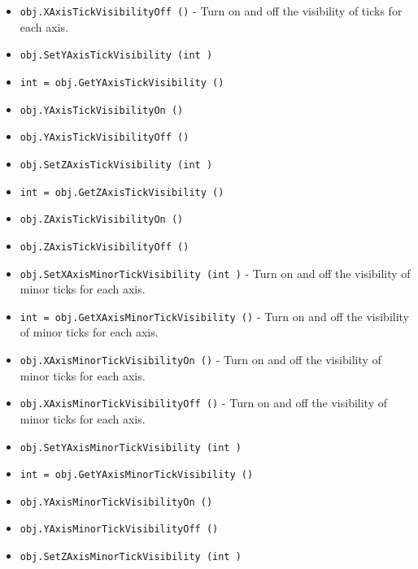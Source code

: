 \begin{itemize}
\item  \verb|obj.XAxisTickVisibilityOff ()| -  Turn on and off the visibility of ticks for each axis.

\item  \verb|obj.SetYAxisTickVisibility (int )|

\item  \verb|int = obj.GetYAxisTickVisibility ()|

\item  \verb|obj.YAxisTickVisibilityOn ()|

\item  \verb|obj.YAxisTickVisibilityOff ()|

\item  \verb|obj.SetZAxisTickVisibility (int )|

\item  \verb|int = obj.GetZAxisTickVisibility ()|

\item  \verb|obj.ZAxisTickVisibilityOn ()|

\item  \verb|obj.ZAxisTickVisibilityOff ()|

\item  \verb|obj.SetXAxisMinorTickVisibility (int )| -  Turn on and off the visibility of minor ticks for each axis.

\item  \verb|int = obj.GetXAxisMinorTickVisibility ()| -  Turn on and off the visibility of minor ticks for each axis.

\item  \verb|obj.XAxisMinorTickVisibilityOn ()| -  Turn on and off the visibility of minor ticks for each axis.

\item  \verb|obj.XAxisMinorTickVisibilityOff ()| -  Turn on and off the visibility of minor ticks for each axis.

\item  \verb|obj.SetYAxisMinorTickVisibility (int )|

\item  \verb|int = obj.GetYAxisMinorTickVisibility ()|

\item  \verb|obj.YAxisMinorTickVisibilityOn ()|

\item  \verb|obj.YAxisMinorTickVisibilityOff ()|

\item  \verb|obj.SetZAxisMinorTickVisibility (int )|


\end{itemize}
